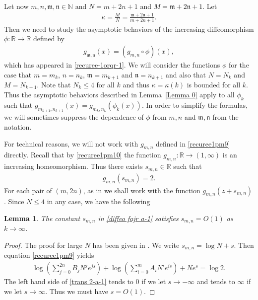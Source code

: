 \documentclass[12pt]{amsart}
\numberwithin{equation}{section}
\newtheorem{lemma}[theorem]{Lemma}
\begin{document}
Let now $m,n,\mathfrak{m},\mathfrak{n}\in \mathbb{N}$ and $N=m+2n+1$ and $M=\mathfrak{m}+2\mathfrak{n}+1$. Let
\begin{equation*}%
\begin{split}
\kappa=\frac{M}{N}=\frac{\mathfrak{m}+2\mathfrak{n}+1}{m+2n+1}.
\end{split}
\end{equation*}
Then we need to study the asymptotic behaviors of the increasing diffeomorphism  $\phi:\mathbb{R}\to\mathbb{R}$ defined by
\begin{equation}\label{diffeo  fajr  a}
\begin{split}
g_{\mathfrak{m},\mathfrak{n}}(x)=(g_{m,n}\circ\phi)(x),
\end{split}
\end{equation}
which has appeared in \eqref{recuree-1orqr-1}. We will consider the functions $\phi$ for the case that $m=m_k$, $n=n_k$, $\mathfrak{m}=m_{k+1}$ and $\mathfrak{n}=n_{k+1}$ and also that $N=N_k$ and $M=N_{k+1}$. Note that $N_k\leq 4$ for all $k$ and thus $\kappa=\kappa(k)$ is bounded for all $k$. Thus the asymptotic behaviors described in Lemma~\ref{Lemma 0} apply to all $\phi_k$ such that $g_{m_{k+1},n_{k+1}}(x)=g_{m_{k},n_{k}}(\phi_k(x))$. In order to simplify the formulas, we will sometimes suppress the dependence of $\phi$ from $m,n$ and $\mathfrak{m},\mathfrak{n}$ from the notation.

For technical reasons, we will not work with $g_{m,n}$ defined in \eqref{recuree1pm9} directly. Recall that by \eqref{recuree1pm10} the function $g_{m,n}:\mathbb{R}\to(1,\infty)$ is an increasing homeomorphism. Thus there exists $s_{m,n}\in \mathbb{R}$ such that
\begin{equation}\label{diffeo  fajr  a-1}
\begin{split}
g_{m,n}(s_{m,n})=2.
\end{split}
\end{equation}
For each pair of $(m,2n)$, as in \cite{Bergweilereremenko2019} we shall work with the function $g_{m,n}(z+s_{m,n})$. Since $N\leq 4$ in any case, we have the following

\begin{lemma}\label{Lemma b}
The constant $s_{m,n}$ in \eqref{diffeo  fajr  a-1} satisfies $s_{m,n}=O(1)$ as $k\to\infty$.
\end{lemma}

\begin{proof}
The proof for large $N$ has been given in \cite[Lemma~2.4]{Zhang2024}. We write $s_{m,n}=\log N+s$. Then equation \eqref{recuree1pm9} yields
\begin{equation}\label{trans 2-a-1}
\begin{split}
\log\left(\sum_{j=0}^{2n}B_jN^je^{js}\right)+\log\left(\sum_{i=0}^{m}A_iN^ie^{is}\right)+Ne^{s}=\log2.
\end{split}
\end{equation}
The left hand side of \eqref{trans 2-a-1} tends to $0$ if we let $s\to-\infty$ and tends to $\infty$ if we let $s\to\infty$. Thus we must have $s=O(1)$.

\end{proof}
\end{document}
